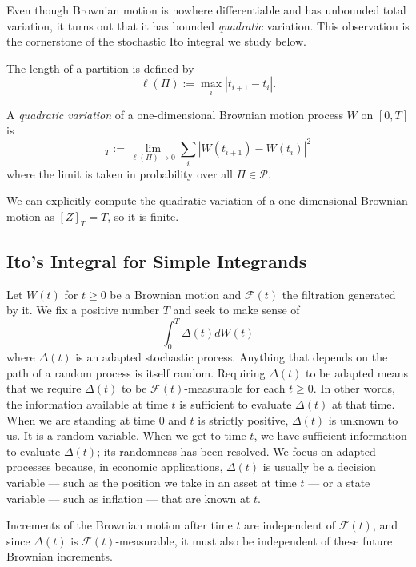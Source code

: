 \documentclass[\topdir/lecture\_notes.tex]{subfiles}
\begin{document}
Even though Brownian motion is nowhere differentiable and has unbounded total variation, it turns out that it has bounded \textit{quadratic} variation. This observation is the cornerstone of the stochastic Ito integral we study below.

The length of a partition is defined by
\begin{equation*}
\ell(\Pi):=\max _{i}\left|t_{i+1}-t_{i}\right|.
\end{equation*}
\begin{defn}\label{defn:quadratic_variation}
A \emph{quadratic variation} of a one-dimensional Brownian motion process $W$ on $[0, T]$ is
\begin{equation*}
[W,W]_{T} := \lim _{\ell(\Pi) \rightarrow 0} \sum_{i}\left|W(t_{i+1})-W(t_{i})\right|^{2}
\end{equation*}
where the limit is taken in probability over all $\Pi\in\mathcal{P}$.
\end{defn}
We can explicitly compute the quadratic variation of a one-dimensional Brownian motion as $[Z]_{T}=T$, so it is finite. 

\subsection{Ito's Integral for Simple Integrands}
Let $W(t)$ for $t\geq 0$ be a Brownian motion and $\mathcal{F}(t)$ the filtration generated by it. We fix a positive number $T$ and seek to make sense of
\begin{equation}
\int_{0}^{T} \Delta(t) d W(t) \label{eq:ito_integral}
\end{equation}
where $\Delta(t)$ is an adapted stochastic process. Anything that depends on the path of a random process is itself random. Requiring $\Delta(t)$ to be adapted means that we require $\Delta(t)$ to be $\mathcal{F}(t)$-measurable for each $t \geq 0$. In other words, the information available at time $t$ is sufficient to evaluate $\Delta(t)$ at that time. When we are standing at time $0$ and $t$ is strictly positive, $\Delta(t)$ is unknown to us. It is a random variable. When we get to time $t$, we have sufficient information to evaluate $\Delta(t)$; its randomness has been resolved. We focus on adapted processes because, in economic applications, $\Delta(t)$ is usually be a decision variable --- such as the position we take in an asset at time $t$ --- or a state variable --- such as inflation --- that are known at $t$.

Increments of the Brownian motion after time $t$ are independent of $\mathcal{F}(t)$, and since $\Delta(t)$ is $\mathcal{F}(t)$-measurable, it must also be independent of these future Brownian increments.
\end{document}
